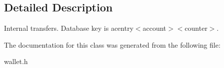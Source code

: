 \subsection{Detailed Description}
Internal transfers. Database key is acentry$<$account$>$$<$counter$>$. 

The documentation for this class was generated from the following file\+:\begin{DoxyCompactItemize}
\item 
wallet.\+h\end{DoxyCompactItemize}

